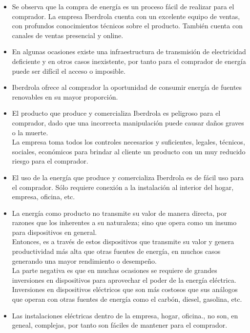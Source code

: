 \documentclass{article}
\begin{document}
\begin{itemize}
    \item Se observa que la compra de energía es un proceso fácil de realizar para el comprador. La empresa Iberdrola cuenta con un excelente equipo de ventas, con profundos conocimientos técnicos sobre el producto. También cuenta con canales de ventas presencial y online. 
    \item En algunas ocasiones existe una infraestructura de transmisión de electricidad deficiente y en otros casos inexistente, por tanto para el comprador de energía puede ser difícil el acceso o imposible. 
    \item Iberdrola ofrece al comprador la oportunidad de consumir energía de fuentes renovables en su mayor proporción. 
    \item El producto que produce y comercializa Iberdrola es peligroso para el comprador, dado que una incorrecta manipulación puede causar daños graves o la muerte. 
    \\
    La empresa toma todos los controles necesarios y suficientes, legales, técnicos, sociales, económicos para brindar al cliente un producto con un muy reducido riesgo para el comprador. 
    \item El uso de la energía que produce y comercializa Iberdrola es de fácil uso para el comprador. Sólo requiere conexión a la instalación al interior del hogar, empresa, oficina, etc. 
    \item La energía como producto no transmite su valor de manera directa, por razones que los inherentes a su naturaleza; sino que opera como un insumo para dispositivos en general. 
    \\
    Entonces, es a través de estos dispositivos que transmite su valor y genera productividad más alta que otras fuentes de energía, en muchos casos generando una mayor rendimiento o desempeño.   
    \\

    La parte negativa es que en muchas ocasiones se requiere de grandes inversiones en dispositivos para aprovechar el poder de la energía eléctrica. Inversiones en dispositivos eléctricos que son más costosos que sus análogos que operan con otras fuentes de energía como el carbón, diesel, gasolina, etc. 
    \item Las instalaciones eléctricas dentro de la empresa, hogar, oficina., no son, en geneal, complejas, por tanto son fáciles de mantener para el comprador.  
    
\end{itemize}
\end{document}
